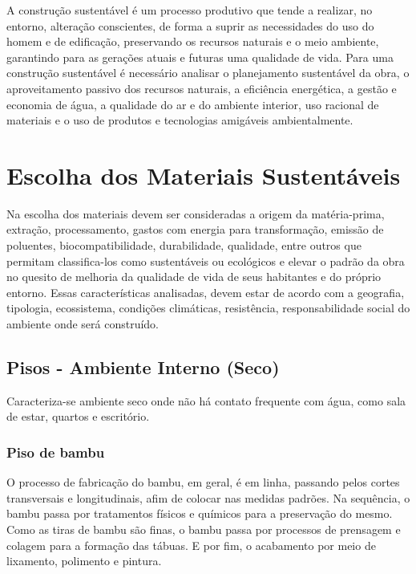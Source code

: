 	A construção sustentável é um processo produtivo que tende a realizar, no entorno, alteração conscientes, de forma a suprir as necessidades do uso do homem e de edificação, preservando os recursos naturais e o meio ambiente, garantindo para as gerações atuais e futuras uma qualidade de vida\cite{1992Baroni}. Para uma construção sustentável é necessário analisar o planejamento sustentável da obra, o aproveitamento passivo dos recursos naturais, a eficiência energética, a gestão e economia de água, a qualidade do ar e do ambiente interior, uso racional de materiais e o uso de produtos e tecnologias amigáveis ambientalmente\cite{2012Araujo}.


\section{Escolha dos Materiais Sustentáveis}

	Na escolha dos materiais devem ser consideradas a origem da matéria-prima, extração, processamento, gastos com energia para transformação, emissão de poluentes, biocompatibilidade, durabilidade, qualidade, entre outros que permitam classifica-los como sustentáveis ou ecológicos e elevar o padrão da obra no quesito de melhoria da qualidade de vida de seus habitantes e do próprio entorno. Essas características analisadas, devem estar de acordo com a geografia, tipologia, ecossistema, condições climáticas, resistência, responsabilidade social do ambiente onde será construído.

\subsection{Pisos - Ambiente Interno (Seco)}
	
	Caracteriza-se ambiente seco onde não há contato frequente com água, como sala de estar, quartos e escritório.

\subsubsection*{\textbf{Piso de bambu}}

	O processo de fabricação do bambu, em geral, é em linha, passando pelos cortes transversais e longitudinais, afim de colocar nas medidas padrões. Na sequência, o bambu passa por tratamentos físicos e químicos para a preservação do mesmo. Como as tiras de bambu são finas, o bambu passa por processos de prensagem e colagem para a formação das tábuas. E por fim, o acabamento por meio de lixamento, polimento e pintura.\cite{pisoBambu}

